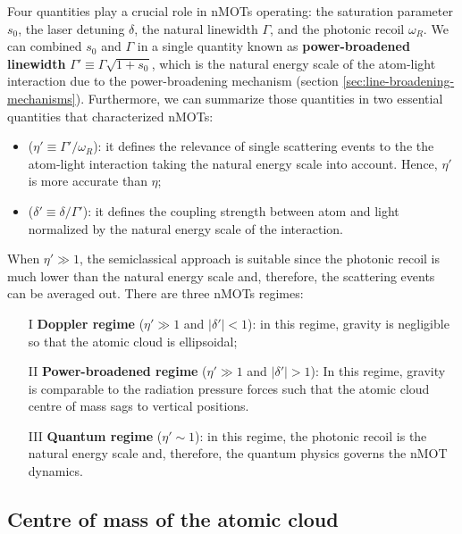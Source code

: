 Four quantities play a crucial role in nMOTs operating: the saturation parameter $ s_0 $, the laser detuning $ \delta $, the natural linewidth $ \Gamma $, and the photonic recoil $ \omega_R $. We can combined $ s_0 $ and $ \Gamma $ in a single quantity known as \textbf{power-broadened linewidth} $ \Gamma' \equiv \Gamma \sqrt{1 + s_0} $, which is the natural energy scale of the atom-light interaction due to the power-broadening mechanism (section \ref{sec:line-broadening-mechanisms}). Furthermore, we can summarize those quantities in two essential quantities that characterized nMOTs:
\begin{itemize}
    \item ($ \eta' \equiv \Gamma' / \omega_R $): it defines the relevance of single scattering events to the the atom-light interaction taking the natural energy scale into account. Hence, $ \eta' $ is more accurate than $ \eta $;
    \item ($ \delta' \equiv \delta / \Gamma' $): it defines the coupling strength between atom and light normalized by the natural energy scale of the interaction.
\end{itemize}
When $ \eta' \gg 1 $, the semiclassical approach is suitable since the photonic recoil is much lower than the natural energy scale and, therefore, the scattering events can be averaged out. There are three nMOTs regimes:
\begin{enumerate}
    \item[I] \textbf{Doppler regime} ($ \eta' \gg 1 $ and $ |\delta'| < 1 $): in this regime, gravity is negligible so that the atomic cloud is ellipsoidal;
    \item[II] \textbf{Power-broadened regime} ($ \eta' \gg 1 $ and $ |\delta'| > 1 $): In this regime, gravity is comparable to the radiation pressure forces such that the atomic cloud centre of mass sags to vertical positions.
    \item[III] \textbf{Quantum regime} ($ \eta' \sim 1 $): in this regime, the photonic recoil is the natural energy scale and, therefore, the quantum physics governs the nMOT dynamics.
\end{enumerate}

\subsection{Centre of mass of the atomic cloud}
\label{sec:nMOT-centre-of-mass}


